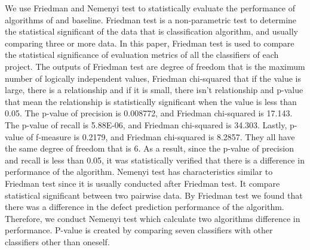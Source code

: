 We use Friedman and Nemenyi test to statistically evaluate the performance of algorithms of {\simfinmo} and baseline. Friedman test is a non-parametric test to determine the statistical significant of the data that is classification algorithm, and usually comparing three or more data. In this paper, Friedman test is used to compare the statistical significance of evaluation metrics of all the classifiers of each project. The outputs of Friedman test are degree of freedom that is the maximum number of logically independent values, Friedman chi-squared that if the value is large, there is a relationship and if it is small, there isn't relationship and p-value that mean the relationship is statistically significant when the value is less than 0.05.
The p-value of precision is  0.008772, and Friedman chi-squared is 17.143. The p-value of recall is 5.88E-06, and Friedman chi-squared is 34.303. Lastly, p-value of f-measure is 0.2179, and Friedman chi-squared is 8.2857. They all have the same degree of freedom that is 6. As a result, since the p-value of precision and recall is less than 0.05, it was statistically verified that there is a difference in performance of the algorithm. Nemenyi test has characteristics similar to Friedman test since it is usually conducted after Friedman test. It compare statistical significant between two pairwise data. By Friedman test we found that there was a difference in the defect prediction performance of the algorithm. Therefore, we conduct Nemenyi test which calculate two algorithms difference in performance. P-value is created by comparing seven classifiers with other classifiers other than oneself.


